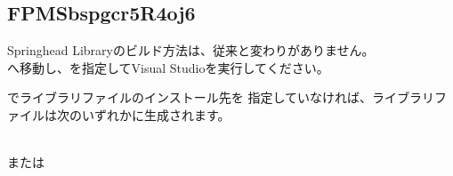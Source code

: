 \subsection{FPMSbspgcr5R4oj6}
\label{subsec:BuildLibrary}

\noindent
Springhead Library\KLUDGE のビルド方法は、従来と変わりがありません。\\
\build \KLUDGE へ移動し、\KLUDGE を指定してVisual Studio\KLUDGE を実行してください。

\medskip
\noindent
{}\KLUDGE でライブラリファイルのインストール先を
\KLUDGE 指定していなければ、ライブラリファイルは次のいずれかに生成されます。

\noindent
\hspace{20pt}\\
\KLUDGE または\\
\hspace{20pt}\\

